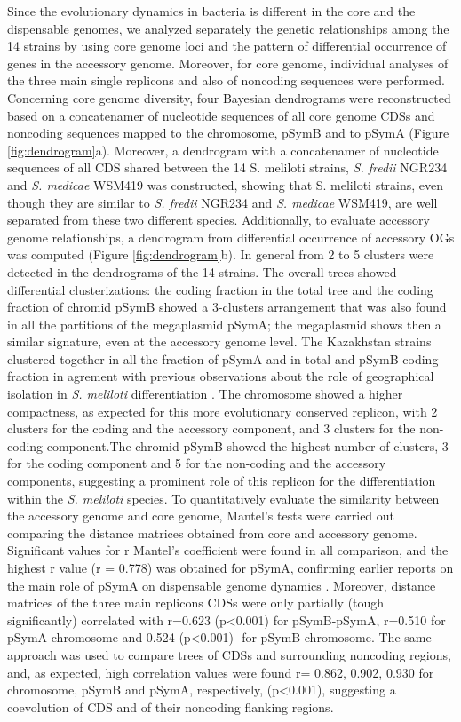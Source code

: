 Since the evolutionary dynamics in bacteria is different in the core and the dispensable genomes, we analyzed separately the genetic relationships among the 14 strains by using core genome loci and the pattern of differential occurrence of genes in the accessory genome. Moreover, for core genome, individual analyses of  the three main single replicons  and also of noncoding sequences were performed.
Concerning core genome diversity, four Bayesian dendrograms were reconstructed based on a concatenamer of nucleotide sequences of all core genome CDSs and noncoding sequences  mapped to the chromosome, pSymB and to pSymA (Figure \ref{fig:dendrogram}a). Moreover, a dendrogram with a concatenamer of nucleotide sequences of all CDS shared between the 14 S. meliloti strains, \textit{S. fredii} NGR234 and \textit{S. medicae} WSM419 was constructed, showing that S. meliloti strains, even though they are similar to \textit{S. fredii} NGR234 and \textit{S. medicae} WSM419, are well separated from these two different species. 
Additionally, to evaluate accessory genome relationships, a dendrogram from differential occurrence of accessory OGs was computed (Figure \ref{fig:dendrogram}b). In general from 2 to 5 clusters  were detected in the dendrograms of the 14 strains. The overall trees showed differential clusterizations: the coding fraction in the total tree and the coding fraction of chromid pSymB showed a 3-clusters arrangement that was also found in all the partitions of the megaplasmid pSymA; the megaplasmid shows then a similar signature, even at the accessory genome level. The Kazakhstan strains clustered  together in all the fraction of  pSymA and  in total and pSymB coding fraction in agrement with previous observations about the role of geographical isolation in \textit{S. meliloti} differentiation \cite{talebi2008diversity}. The chromosome showed a higher compactness, as expected for this more evolutionary conserved replicon, with 2 clusters for the coding and the accessory component, and 3 clusters for the non-coding component.The chromid pSymB showed the highest number of clusters, 3 for the coding component and 5 for the non-coding and the accessory components, suggesting a prominent role of this replicon for the differentiation within the \textit{S. meliloti} species.
To quantitatively evaluate the similarity between the accessory genome and core genome, Mantel's tests were carried out comparing the distance matrices obtained from core and accessory genome. Significant values for r Mantel's coefficient were found in all comparison, and the highest r value (r = 0.778) was obtained for pSymA, confirming earlier reports on the main role of pSymA on dispensable genome dynamics \cite{giuntini2005large}\cite{donini2009genome}. Moreover, distance matrices  of the three  main replicons CDSs were only partially (tough significantly) correlated  with r=0.623 (p<0.001) for pSymB-pSymA, r=0.510 for pSymA-chromosome and 0.524 (p<0.001) -for pSymB-chromosome. The same approach was used to compare trees of CDSs and surrounding noncoding regions, and, as expected, high correlation values were found r= 0.862, 0.902, 0.930 for chromosome, pSymB and pSymA, respectively, (p<0.001), suggesting a coevolution of CDS and of their noncoding flanking regions.  

